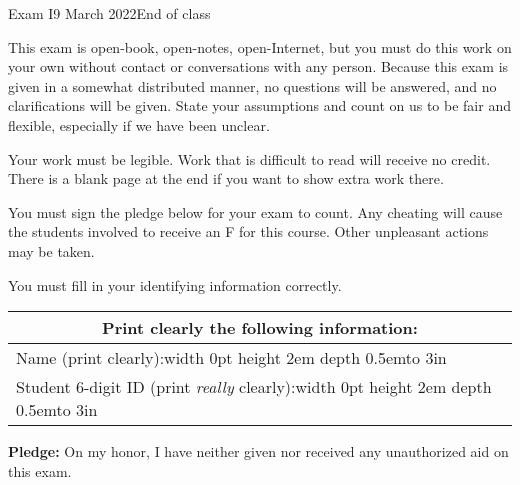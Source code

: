 \documentclass[12pt]{article}
\def\Tall{\vrule width 0pt height 2em depth 0.5em}
\begin{document}
\begin{assignment}{Exam I}{9 March 2022}{End of class}

{\small {\large {}}
This exam is open-book, open-notes, open-Internet, but you must do this
work on your own without contact or conversations with any person.
Because this exam is given in a somewhat distributed manner, no questions will be answered, and no clarifications will be given.  State your assumptions and count on us to be fair and flexible, especially if we have been unclear.


Your work must be legible.  Work that is
difficult to read will receive no credit.  There is a blank page at the end
if you want to show extra work there.

You must sign the pledge below for your exam to count.  Any cheating will
cause the students involved to receive an F for this course. Other unpleasant
actions
may be taken.

You must fill in your identifying information correctly.  
}

\begin{center}\large
\begin{tabular}{|c|c|c|} \hline
\multicolumn{3}{|c|}{{\bf Print  clearly} the following information:}  \\ \hline
\multicolumn{3}{|l|}{Name (print clearly):\Tall{}\hbox to 3in{\hss}}  \\ \hline
\multicolumn{3}{|l|}{Student 6-digit ID (print {\it really} clearly):\Tall{}\hbox to 3in{\hss}} \\ \hline
\end{tabular}
\end{center}

{\bf Pledge:} On my honor, I have neither
given nor received any unauthorized aid on this exam.


\end{assignment}
\end{document}

